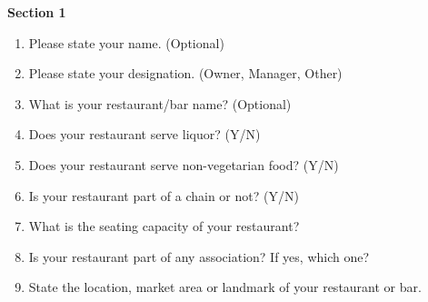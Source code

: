 \documentclass[a4paper, 12pt, twoside]{article}
\begin{document}
  \begin{mdframed}[backgroundcolor=gray!20]
  \textbf{Section 1}
		\begin {enumerate}[nosep]
		\item Please state your name. (Optional)
		\item Please state your designation. (Owner, Manager, Other)
		\item What is your restaurant/bar name? (Optional)
		\item Does your restaurant serve liquor? (Y/N)
		\item Does your restaurant serve non-vegetarian food? (Y/N)
		\item Is your restaurant part of a chain or not? (Y/N)
		\item What is the seating capacity of your restaurant?
		\item Is your restaurant part of any association? If yes, which one?
		\item State the location, market area or landmark of your restaurant or bar.
		\end {enumerate}
	

\end{mdframed}
\end{document}
